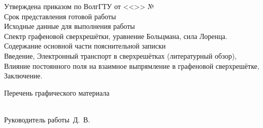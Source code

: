 \begin{titlepage}
\begin{flushleft}
        Утверждена приказом по ВолгГТУ от <<\underline{\hspace{.5cm}}>> \underline{\hspace{4cm}} №\underline{\hspace{2cm}}\\
        \vspace{.3cm}
        Срок представления готовой работы \hrulefill\\
        \vspace{.3cm}
        Исходные данные для выполнения работы\\
        Спектр графеновой сверхрешётки, уравнение Больцмана, сила Лоренца.\\
        \vspace{.3cm}
        Содержание основной части пояснительной записки\\
        Введение, Электронный транспорт в сверхрешётках (литературный обзор), Влияние постоянного поля на взаимное выпрямление в графеновой сверхрешётке, Заключение.
        \vspace{.3cm}
        \begin{center}
            Перечень графического материала\\
            \hrulefill\\
        \end{center}
        \vspace{1cm}
        Руководитель работы\hfill\underline{\hspace{5cm}}~Д.~В.
    \end{flushleft}
\end{titlepage}